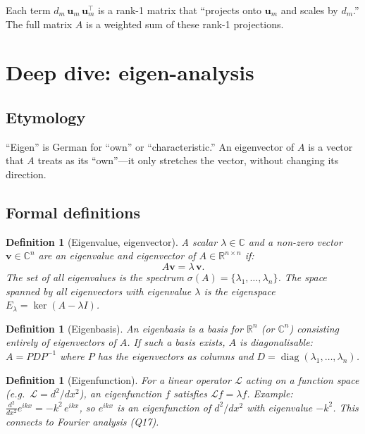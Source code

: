 \documentclass[11pt,a4paper]{article}
\newtheorem{definition}[theorem]{Definition}
\newcommand{\R}{\mathbb{R}}
\newcommand{\C}{\mathbb{C}}
\newcommand{\diag}{\operatorname{diag}}
\begin{document}
Each term $d_m\,\mathbf{u}_m\,\mathbf{u}_m^\top$ is a rank-1 matrix that ``projects onto $\mathbf{u}_m$ and scales by $d_m$.'' The full matrix $A$ is a weighted sum of these rank-1 projections.


\section{Deep dive: eigen-analysis}
\label{sec:q13}

\subsection{Etymology}

``Eigen'' is German for ``own'' or ``characteristic.''  An eigenvector of $A$ is a vector that $A$ treats as its ``own''---it only stretches the vector, without changing its direction.

\subsection{Formal definitions}

\begin{definition}[Eigenvalue, eigenvector]
A scalar $\lambda \in \C$ and a non-zero vector $\mathbf{v} \in \C^n$ are an \emph{eigenvalue} and \emph{eigenvector} of $A \in \R^{n \times n}$ if:
\begin{equation}
  A\mathbf{v} = \lambda\,\mathbf{v}.
\end{equation}
The set of all eigenvalues is the \emph{spectrum} $\sigma(A) = \{\lambda_1, \dots, \lambda_n\}$.  The space spanned by all eigenvectors with eigenvalue $\lambda$ is the \emph{eigenspace} $E_\lambda = \ker(A - \lambda I)$.
\end{definition}

\begin{definition}[Eigenbasis]
An \emph{eigenbasis} is a basis for $\R^n$ (or $\C^n$) consisting entirely of eigenvectors of $A$.  If such a basis exists, $A$ is \emph{diagonalisable}: $A = PDP^{-1}$ where $P$ has the eigenvectors as columns and $D = \diag(\lambda_1, \dots, \lambda_n)$.
\end{definition}

\begin{definition}[Eigenfunction]
For a linear operator $\mathcal{L}$ acting on a function space (e.g.\ $\mathcal{L} = d^2/dx^2$), an \emph{eigenfunction} $f$ satisfies $\mathcal{L}f = \lambda f$.  Example: $\frac{d^2}{dx^2}e^{ikx} = -k^2\,e^{ikx}$, so $e^{ikx}$ is an eigenfunction of $d^2/dx^2$ with eigenvalue $-k^2$.  This connects to Fourier analysis (Q17).
\end{definition}
\end{document}
